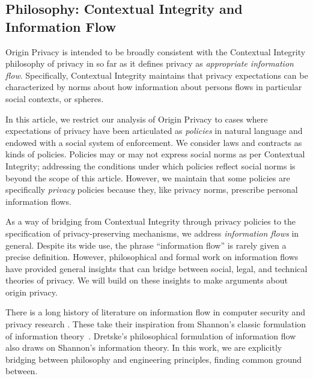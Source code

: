 \documentclass[../thesis.tex]{subfiles}
\begin{document}
\subsection{Philosophy: Contextual Integrity and Information Flow}

Origin Privacy is intended to be broadly consistent
with the Contextual Integrity \cite{nissenbaum09book}
philosophy of privacy in so far as it defines privacy
as \emph{appropriate information flow}.
Specifically, Contextual Integrity maintains that
privacy expectations can be characterized by norms
about how information about persons flows in particular
social contexts, or spheres.

In this article, we restrict our analysis of Origin Privacy
to cases where expectations of privacy have been articulated
as \emph{policies} in natural language and endowed with a 
social system of enforcement.
We consider laws and contracts as kinds of policies.
Policies may or may not express social norms as per
Contextual Integrity; addressing the conditions under
which policies reflect social norms is beyond the scope
of this article.
However, we maintain that some policies are specifically
\emph{privacy} policies because they, like privacy norms,
prescribe personal information flows. 

As a way of bridging from Contextual Integrity through
privacy policies to the specification of privacy-preserving
mechanisms, we address \emph{information flows} in general.
Despite its wide use, the phrase ``information flow''
is rarely given a precise definition.
However, philosophical and formal work on information flows have
provided general insights that can bridge between social, legal,
and technical theories of privacy.
We will build on these insights to make
arguments about origin privacy.

There is a long history of literature on information flow
in computer security and privacy 
research \cite{mclean90sp,gray91sp,barthe04csf,tschantz15csf,smith15lics}.
These take their inspiration from Shannon's classic formulation 
of information theory~\cite{shannon1948mathematical}.
Dretske's philosophical
formulation of information flow~\cite{dretske1983epistemology}
also draws on Shannon's information theory.
In this work, we are explicitly bridging between philosophy and engineering
principles, finding common ground between.
\end{document}
